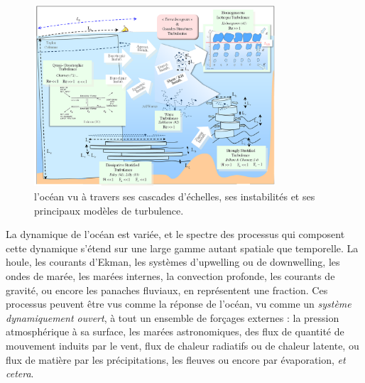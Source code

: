 \begin{figure}[!h]
  \centering
  \includegraphics[width=0.8\textwidth]{./INTRO/Ocean_scales.png}
  \caption{\color{red}l'océan vu à travers ses cascades d'échelles, ses instabilités et ses principaux modèles de turbulence.\color{black}}
  \label{fig_ocean_scales}
\end{figure}


\color{red}La dynamique de l'océan est variée, et le spectre des processus qui composent cette dynamique s'étend sur une large gamme autant spatiale que temporelle. La houle, les courants d'Ekman, les systèmes d'upwelling ou de downwelling, les ondes de marée, les marées internes, la convection profonde, les courants de gravité, ou encore les panaches fluviaux, en représentent une fraction. Ces processus peuvent être vus comme la réponse de l'océan, vu comme un \textit{système dynamiquement ouvert}, à tout un ensemble de forçages externes : la pression atmosphérique à sa surface, les marées astronomiques, des flux de quantité de mouvement induits par le vent, flux de chaleur radiatifs ou de chaleur latente, ou flux de matière par les précipitations, les fleuves ou encore par évaporation, \textit{et cetera}.\color{black}



